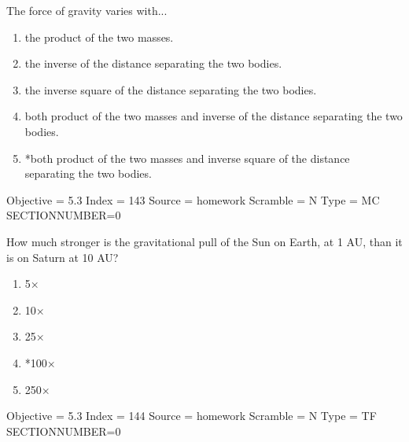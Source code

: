 \documentclass[11pt]{article}
\begin{document}
\begin{enumerate}
\begin{minipage}{\textwidth}
\begin{minipage}{\textwidth}
\item The force of gravity varies with...
\begin{enumerate} 
\setlength{\itemsep}{1pt} 
\setlength{\parskip}{0pt} 
\setlength{\parsep}{0pt}
\setlength{\multicolsep}{1pt} 
\item the product of the two masses.
\item the inverse of the distance separating the two bodies.
\item the inverse square of the distance separating the two bodies.
\item both product of the two masses and inverse of the distance separating the two bodies.
\item *both product of the two masses and inverse square of the distance separating the two bodies.
\end{enumerate} 
Objective = 5.3
Index = 143
Source = homework
Scramble = N
Type = MC
SECTIONNUMBER=0
\end{minipage}
\end{minipage}
\vskip 0.20in

\begin{minipage}{\textwidth}
\begin{minipage}{\textwidth}
\item How much stronger is the gravitational pull of the Sun on Earth, at 1 AU, than it is on Saturn at 10 AU?
\begin{multicols}{3}
\begin{enumerate} 
\setlength{\itemsep}{1pt} 
\setlength{\parskip}{0pt} 
\setlength{\parsep}{0pt}
\setlength{\multicolsep}{1pt} 
\item 5×
\item 10×
\item 25×
\item *100×
\item 250×
\end{enumerate} 
\vfill 
\end{multicols}

Objective = 5.3
Index = 144
Source = homework
Scramble = N
Type = TF
SECTIONNUMBER=0
\end{minipage}
\end{minipage}
\vskip 0.20in


\end{enumerate}
\end{document}
